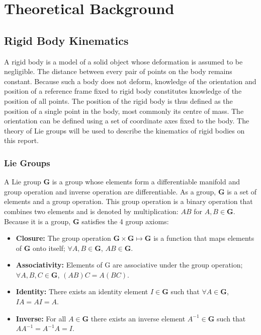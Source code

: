   \section{Theoretical Background}

\subsection{Rigid Body Kinematics}
	A rigid body is a model of a solid object whose deformation is assumed to be negligible. The distance between every pair of points on the body remains constant. Because such a body does not deform, knowledge of the orientation and position of a reference frame fixed to rigid body constitutes knowledge of the position of all points. The position of the rigid body is thus defined as the position of a single point in the body, most commonly its centre of mass. The orientation can be defined using a set of coordinate axes fixed to the body.
	The theory of Lie groups will be used to describe the kinematics of rigid bodies on this report.
			
	\subsubsection{Lie Groups}		
		A Lie group $\mathbf{G}$ is a group whose elements form a differentiable manifold and group operation and inverse operation are differentiable.
		As a group, $\mathbf{G}$ is a set of elements and a group operation. This group operation is a binary operation that combines two elements and is denoted by multiplication: $AB$ for $A,B \in \mathbf{G}$. Because it is a group, $\mathbf{G}$ satisfies the 4 group axioms:
		\begin{itemize}
		\item \textbf{Closure:} 
			The group operation
			$\mathbf{G} \times \mathbf{G} \mapsto \mathbf{G}$ 
			is a function that maps elements of $\mathbf{G}$ onto itself;
			$\forall A,B \in \mathbf{G}$, $AB \in \mathbf{G}$.
		\item \textbf{Associativity:} Elements of G are associative under the group operation;
			$\forall A,B,C \in \mathbf{G}$, $(AB)C=A(BC)$.
		\item \textbf{Identity:} There exists an identity element $I \in \mathbf{G}$  such that
			$\forall A \in \mathbf{G}$, $IA = AI = A$.
		\item \textbf{Inverse:} For all $A \in \mathbf{G}$ there exists an inverse element $A^{-1} \in \mathbf{G}$ such that $AA^{-1}=A^{-1}A=I$. 
		\end{itemize}
		
